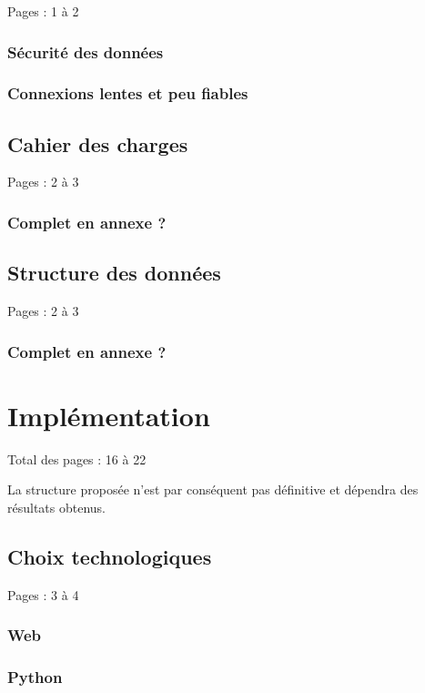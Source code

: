 \documentclass{eplmastersthesis_FR}
\begin{document}
			Pages : 1 à 2

			\subsection*{Sécurité des données}
			\subsection*{Connexions lentes et peu fiables}

		\section{Cahier des charges}

			Pages : 2 à 3

			\subsection*{Complet en annexe ?}

		\section{Structure des données}

			Pages : 2 à 3

			\subsection*{Complet en annexe ?}

	\chapter{Implémentation}

		Total des pages : 16 à 22

		La structure proposée n'est par conséquent pas définitive et dépendra des résultats obtenus.

		\section{Choix technologiques}

			Pages : 3 à 4

			\subsection*{Web}
			\subsection*{Python}
\end{document}
